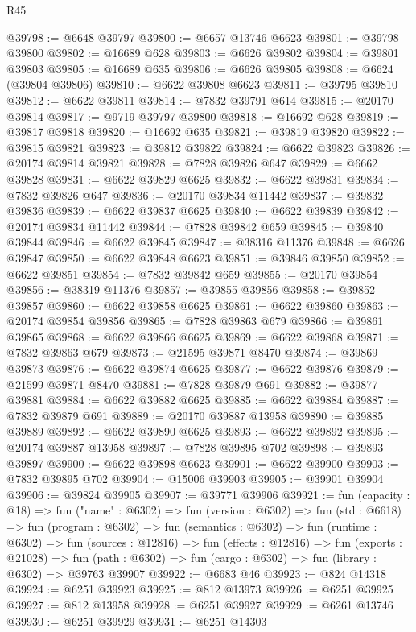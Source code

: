 \begin{lexlean}{R45}
\begin{coremodule}
{@39798 := @6648 @39797
@39800 := @6657 @13746 @6623
@39801 := @39798 @39800
@39802 := @16689 @628
@39803 := @6626 @39802
@39804 := @39801 @39803
@39805 := @16689 @635
@39806 := @6626 @39805
@39808 := @6624 (@39804 @39806)
@39810 := @6622 @39808 @6623
@39811 := @39795 @39810
@39812 := @6622 @39811
@39814 := @7832 @39791 @614
@39815 := @20170 @39814
@39817 := @9719 @39797 @39800
@39818 := @16692 @628
@39819 := @39817 @39818
@39820 := @16692 @635
@39821 := @39819 @39820
@39822 := @39815 @39821
@39823 := @39812 @39822
@39824 := @6622 @39823
@39826 := @20174 @39814 @39821
@39828 := @7828 @39826 @647
@39829 := @6662 @39828
@39831 := @6622 @39829 @6625
@39832 := @6622 @39831
@39834 := @7832 @39826 @647
@39836 := @20170 @39834 @11442
@39837 := @39832 @39836
@39839 := @6622 @39837 @6625
@39840 := @6622 @39839
@39842 := @20174 @39834 @11442
@39844 := @7828 @39842 @659
@39845 := @39840 @39844
@39846 := @6622 @39845
@39847 := @38316 @11376
@39848 := @6626 @39847
@39850 := @6622 @39848 @6623
@39851 := @39846 @39850
@39852 := @6622 @39851
@39854 := @7832 @39842 @659
@39855 := @20170 @39854
@39856 := @38319 @11376
@39857 := @39855 @39856
@39858 := @39852 @39857
@39860 := @6622 @39858 @6625
@39861 := @6622 @39860
@39863 := @20174 @39854 @39856
@39865 := @7828 @39863 @679
@39866 := @39861 @39865
@39868 := @6622 @39866 @6625
@39869 := @6622 @39868
@39871 := @7832 @39863 @679
@39873 := @21595 @39871 @8470
@39874 := @39869 @39873
@39876 := @6622 @39874 @6625
@39877 := @6622 @39876
@39879 := @21599 @39871 @8470
@39881 := @7828 @39879 @691
@39882 := @39877 @39881
@39884 := @6622 @39882 @6625
@39885 := @6622 @39884
@39887 := @7832 @39879 @691
@39889 := @20170 @39887 @13958
@39890 := @39885 @39889
@39892 := @6622 @39890 @6625
@39893 := @6622 @39892
@39895 := @20174 @39887 @13958
@39897 := @7828 @39895 @702
@39898 := @39893 @39897
@39900 := @6622 @39898 @6623
@39901 := @6622 @39900
@39903 := @7832 @39895 @702
@39904 := @15006 @39903
@39905 := @39901 @39904
@39906 := @39824 @39905
@39907 := @39771 @39906
@39921 := fun (capacity : @18) =>
  fun ("name" : @6302) =>
  fun (version : @6302) =>
  fun (std : @6618) =>
  fun (program : @6302) =>
  fun (semantics : @6302) =>
  fun (runtime : @6302) =>
  fun (sources : @12816) =>
  fun (effects : @12816) =>
  fun (exports : @21028) =>
  fun (path : @6302) => fun (cargo : @6302) => fun (library : @6302) => @39763 @39907
@39922 := @6683 @46
@39923 := @824 @14318
@39924 := @6251 @39923
@39925 := @812 @13973
@39926 := @6251 @39925
@39927 := @812 @13958
@39928 := @6251 @39927
@39929 := @6261 @13746
@39930 := @6251 @39929
@39931 := @6251 @14303
}
\end{coremodule}
\end{lexlean}
